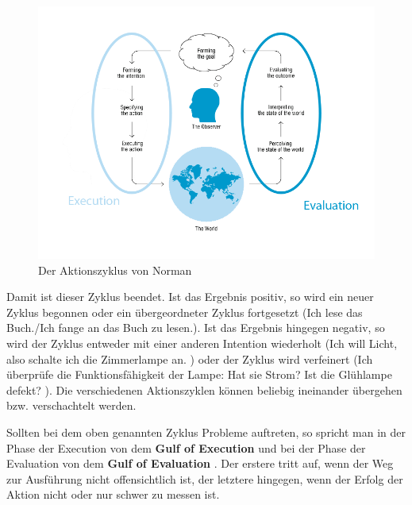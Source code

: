 \documentclass[parskip,headsepline, headtopline, %
footsepline, oneside, 12pt, headings=small]{scrreprt}
\begin{document}
\begin{figure}
\includegraphics[width=\textwidth]{images/ActionCycle.png}
\caption{Der Aktionszyklus von Norman}
\label{fig:action}
\end{figure}

Damit ist dieser Zyklus beendet. Ist das Ergebnis positiv, so wird ein neuer Zyklus begonnen oder ein übergeordneter Zyklus fortgesetzt (\glqq Ich lese das Buch./Ich fange an das Buch zu lesen.\grqq). Ist das Ergebnis hingegen negativ, so wird der Zyklus entweder mit einer anderen Intention wiederholt (\glqq Ich will Licht, also schalte ich die Zimmerlampe an. \grqq) oder der Zyklus wird verfeinert (\glqq Ich überprüfe die Funktionsfähigkeit der Lampe: Hat sie Strom? Ist die Glühlampe defekt? \grqq). Die verschiedenen Aktionszyklen können beliebig ineinander übergehen bzw. verschachtelt werden.
 
Sollten bei dem oben genannten Zyklus Probleme auftreten, so spricht man in der Phase der Execution von dem \textbf{Gulf of Execution} und bei der Phase der Evaluation von dem \textbf{Gulf of Evaluation} \cite[S. 49-52]{don}. Der erstere tritt auf, wenn der Weg zur Ausführung nicht offensichtlich ist, der letztere hingegen, wenn der Erfolg der Aktion nicht oder nur schwer zu messen ist.
\end{document}

